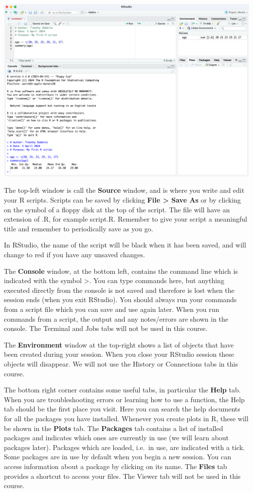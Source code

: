 \documentclass[
  a4paper,
]{memoir}
\begin{document}
\includegraphics[width=1\textwidth,height=\textheight]{img/mod01/RStudio-screenshot-03.png}

The top-left window is call the \textbf{Source} window, and is where you
write and edit your R scripts. Scripts can be saved by clicking
\textbf{File \textgreater{} Save As} or by clicking on the symbol of a
floppy disk at the top of the script. The file will have an extension of
.R, for example script.R. Remember to give your script a meaningful
title and remember to periodically save as you go.

In RStudio, the name of the script will be black when it has been saved,
and will change to red if you have any unsaved changes.

The \textbf{Console} window, at the bottom left, contains the command
line which is indicated with the symbol \textgreater. You can type
commands here, but anything executed directly from the console is not
saved and therefore is lost when the session ends (when you exit
RStudio). You should always run your commands from a script file which
you can save and use again later. When you run commands from a script,
the output and any notes/errors are shown in the console. The Terminal
and Jobs tabs will not be used in this course.

The \textbf{Environment} window at the top-right shows a list of objects
that have been created during your session. When you close your RStudio
session these objects will disappear. We will not use the History or
Connections tabs in this course.

The bottom right corner contains some useful tabs, in particular the
\textbf{Help} tab. When you are troubleshooting errors or learning how
to use a function, the Help tab should be the first place you visit.
Here you can search the help documents for all the packages you have
installed. Whenever you create plots in R, these will be shown in the
\textbf{Plots} tab. The \textbf{Packages} tab contains a list of
installed packages and indicates which ones are currently in use (we
will learn about packages later). Packages which are loaded, i.e.~in
use, are indicated with a tick. Some packages are in use by default when
you begin a new session. You can access information about a package by
clicking on its name. The \textbf{Files} tab provides a shortcut to
access your files. The Viewer tab will not be used in this course.
\end{document}
